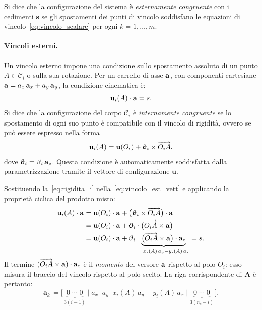 Si dice che la configurazione del sistema è
\emph{esternamente congruente} con i cedimenti
$\bm{s}$ se gli spostamenti dei punti di vincolo
soddisfano le equazioni di vincolo~\eqref{eq:vincolo_scalare}
per ogni $k = 1, \dots, m$.

\paragraph{Vincoli esterni.}
Un vincolo esterno impone una condizione sullo spostamento
assoluto di un punto $A \in \mathcal{C}_i$ o sulla sua
rotazione. Per un carrello di asse $\mathbf{a}$, con componenti
cartesiane $\mathbf{a} = a_x\,\mathbf{a}_x + a_y\,\mathbf{a}_y$, la condizione
cinematica è:
\begin{equation}\label{eq:vincolo_est_vett}
	\mathbf{u}_i(A) \cdot \mathbf{a} = s.
\end{equation}
Si dice che la configurazione del corpo $\mathcal{C}_i$ è
\emph{internamente congruente} se lo spostamento di ogni
suo punto è compatibile con il vincolo di rigidità,
ovvero se può essere espresso nella forma
\begin{equation}\label{eq:rigidita_i}
	\mathbf{u}_i(A) = \mathbf{u}(O_i) + \bm{\upvartheta}_i \times
	\overrightarrow{O_i A},
\end{equation}
dove $\bm{\upvartheta}_i = \vartheta_i\,\mathbf{a}_z$.
Questa condizione è automaticamente soddisfatta dalla
parametrizzazione tramite il vettore di configurazione
$\bm{u}$.

Sostituendo la~\eqref{eq:rigidita_i} nella~\eqref{eq:vincolo_est_vett}
e applicando la proprietà ciclica del prodotto misto:
\begin{align}\label{eq:vincolo_est_scal_cin}
	\mathbf{u}_i(A) \cdot \mathbf{a}
	&= \mathbf{u}(O_i)\cdot\mathbf{a}
	+ \bigl(\bm{\upvartheta}_i \times \overrightarrow{O_i A}
	\bigr)\cdot\mathbf{a} \notag\\
	&= \mathbf{u}(O_i)\cdot\mathbf{a}
	+ \bm{\upvartheta}_i \cdot
	\bigl(\overrightarrow{O_i A} \times \mathbf{a}\bigr) \notag\\
	&= \mathbf{u}(O_i)\cdot\mathbf{a}
	+ \vartheta_i\,
	\underbrace{\bigl(\overrightarrow{O_i A}
		\times \mathbf{a}\bigr)\cdot\mathbf{a}_z}_{
		=\,x_i(A)\,a_y - y_i(A)\,a_x}
	= s.
\end{align}
Il termine $(\overrightarrow{O_i A}\times\mathbf{a})\cdot\mathbf{a}_z$
è il \emph{momento} del versore $\mathbf{a}$ rispetto al polo
$O_i$: esso misura il braccio del vincolo rispetto al polo
scelto. La riga corrispondente di $\bm{A}$ è pertanto:
\begin{equation}\label{eq:ak_esterno}
	\bm{a}_k^{\top} =
	\bigl[\,\underbrace{0 \;\cdots\; 0}_{3(i-1)}
	\;\Big|\;
	a_x \;\; a_y \;\;
	x_i(A)\,a_y - y_i(A)\,a_x
	\;\Big|\;
	\underbrace{0 \;\cdots\; 0}_{3(n_c - i)}\,\bigr].
\end{equation}

